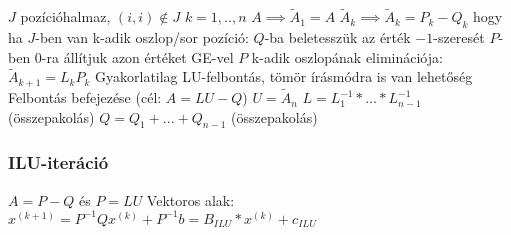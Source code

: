 \documentclass[12pt,a4paper]{article}
\begin{document}
\begin{outline}
	\1 $J$ pozícióhalmaz, $(i,i) \notin J$
	\1 $k=1,..,n$
	\1 $A \implies \widetilde{A}_1 = A$
	\1 $\widetilde{A}_k \implies \widetilde{A}_k = P_k - Q_k$
	\;\; hogy ha $J$-ben van k-adik oszlop/sor pozíció:
		\2 $Q$-ba beletesszük az érték $-1$-szeresét
		\2 $P$-ben 0-ra állítjuk azon értéket
	\1 GE-vel $P$ k-adik oszlopának eliminációja: $\widetilde{A}_{k+1} = L_k P_k$
		\2 Gyakorlatilag LU-felbontás, tömör írásmódra is van lehetőség
	\1 Felbontás befejezése (cél: $A = LU-Q$)
		\2 $U = \widetilde{A}_n$
		\2 $L = L_1^{-1} * ... * L_{n-1}^{-1}$ (összepakolás)
		\2 $Q = Q_1 + ... + Q_{n-1}$ (összepakolás)
\end{outline}

\subsubsection{ILU-iteráció}

\begin{outline}
	\1 $A=P-Q$ és $P=LU$
	\1 Vektoros alak: $x^{(k+1)} = P^{-1} Q x^{(k)} + P^{-1} b = B_{ILU} * x^{(k)} + c_{ILU}$
\end{outline}
\end{document}
